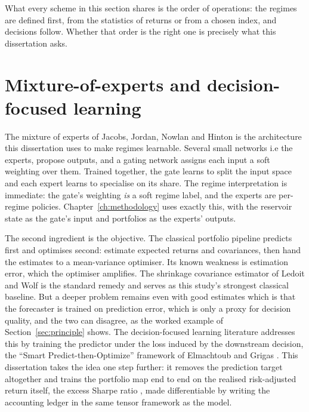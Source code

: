 What every scheme in this section shares is the order of operations: the regimes are defined first, from the statistics of returns or from a chosen index, and decisions follow. Whether that order is the right one is precisely what this dissertation asks.

\section{Mixture-of-experts and decision-focused learning}
\label{sec:bg-moe}

The mixture of experts of Jacobs, Jordan, Nowlan and Hinton \cite{jacobs1991adaptive} is the architecture this dissertation uses to make regimes learnable. Several small networks i.e the experts, propose outputs, and a gating network assigns each input a soft weighting over them. Trained together, the gate learns to split the input space and each expert learns to specialise on its share. The regime interpretation is immediate: the gate's weighting \emph{is} a soft regime label, and the experts are per-regime policies. Chapter~\ref{ch:methodology} uses exactly this, with the reservoir state as the gate's input and portfolios as the experts' outputs.

The second ingredient is the objective. The classical portfolio pipeline predicts first and optimises second: estimate expected returns and covariances, then hand the estimates to a mean-variance optimiser. Its known weakness is estimation error, which the optimiser amplifies. The shrinkage covariance estimator of Ledoit and Wolf \cite{ledoit2004honey} is the standard remedy and serves as this study's strongest classical baseline. But a deeper problem remains even with good estimates which is that the forecaster is trained on prediction error, which is only a proxy for decision quality, and the two can disagree, as the worked example of Section~\ref{sec:principle} shows. The decision-focused learning literature addresses this by training the predictor under the loss induced by the downstream decision, the ``Smart Predict-then-Optimize'' framework of Elmachtoub and Grigas \cite{elmachtoub2022smart}. This dissertation takes the idea one step further: it removes the prediction target altogether and trains the portfolio map end to end on the realised risk-adjusted return itself, the excess Sharpe ratio \cite{sharpe1994sharpe}, made differentiable by writing the accounting ledger in the same tensor framework as the model.
